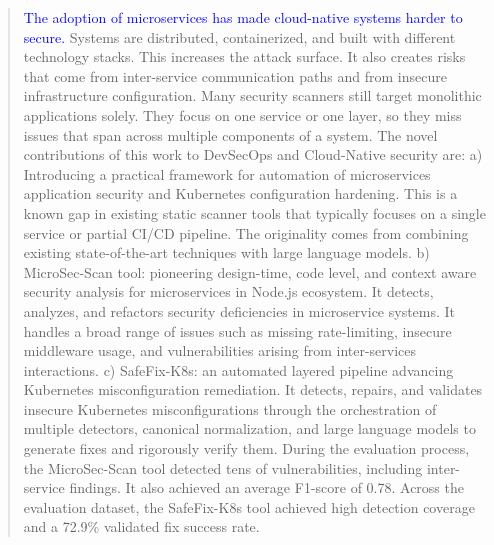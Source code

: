 \documentclass[preprint,12pt]{elsarticle}
\newcommand{\new}[1]{\textcolor{blue}{#1}}
\begin{document}
\begin{frontmatter}
\begin{abstract}
\new{The adoption of microservices has made cloud-native systems harder to secure.} Systems are distributed, containerized, and built with different technology stacks. This increases the attack surface. It also creates risks that come from inter-service communication paths and from insecure infrastructure configuration. Many security scanners still target monolithic applications solely. They focus on one service or one layer, so they miss issues that span across multiple components of a system.
The novel contributions of this work to DevSecOps and Cloud-Native security are: a) Introducing a practical framework for automation of microservices application security and Kubernetes configuration hardening. This is a known gap in existing static scanner tools that typically focuses on a single service or partial CI/CD pipeline. The originality comes from combining existing state-of-the-art techniques with large language models. b) MicroSec-Scan tool: pioneering design-time, code level, and context aware security analysis for microservices in Node.js ecosystem. It detects, analyzes, and refactors security deficiencies in microservice systems. It handles a broad range of issues such as missing rate-limiting, insecure middleware usage, and vulnerabilities arising from inter-services interactions. c) SafeFix-K8s: an automated layered pipeline advancing Kubernetes misconfiguration remediation. It detects, repairs, and validates insecure Kubernetes misconfigurations through the orchestration of multiple detectors, canonical normalization, and large language models to generate fixes and rigorously verify them. During the evaluation process, the MicroSec-Scan tool detected tens of vulnerabilities, including inter-service findings. It also achieved an average F1-score of 0.78. Across the evaluation dataset, the SafeFix-K8s tool achieved high detection coverage and a 72.9\% validated fix success rate. 
\end{abstract}





\begin{graphicalabstract}
\centering
{}
\end{graphicalabstract}
\end{frontmatter}
\end{document}

